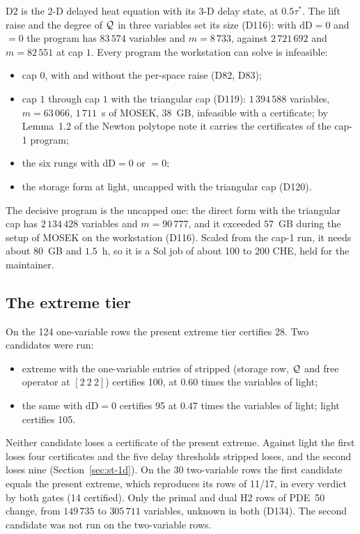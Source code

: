 D2 is the 2-D delayed heat equation with its 3-D delay state, at $0.5\tau^*$. The lift raise and the degree of $\mathcal{Q}$ in three variables set its size (D116): with $\mathrm{dD}=0$ and  $=0$ the program has $83\,574$ variables and $m=8\,733$, against $2\,721\,692$ and $m=82\,551$ at cap $1$. Every program the workstation can solve is infeasible:
\begin{itemize}\setlength\itemsep{0pt}
\item cap $0$, with and without the per-space raise (D82, D83);
\item cap $1$ through cap $1$ with the triangular cap (D119): $1\,394\,588$ variables, $m=63\,066$, $1\,711$~s of MOSEK, $38$~GB, infeasible with a certificate; by Lemma~1.2 of the Newton polytope note it carries the certificates of the cap-1 program;
\item the six rungs with $\mathrm{dD}=0$ or  $=0$;
\item the storage form at light, uncapped with the triangular cap (D120).
\end{itemize}
The decisive program is the uncapped one: the direct form with the triangular cap has $2\,134\,428$ variables and $m=90\,777$, and it exceeded $57$~GB during the setup of MOSEK on the workstation (D116). Scaled from the cap-1 run, it needs about $80$~GB and $1.5$~h, so it is a Sol job of about 100 to 200 CHE, held for the maintainer.

\subsection{The extreme tier}\label{sec:st-extreme}

On the 124 one-variable rows the present extreme tier certifies 28. Two candidates were run:
\begin{itemize}\setlength\itemsep{0pt}
\item extreme with the one-variable entries of stripped (storage row, $\mathcal{Q}$ and free operator at $[2\ 2\ 2]$) certifies 100, at $0.60$ times the variables of light;
\item the same with $\mathrm{dD}=0$ certifies 95 at $0.47$ times the variables of light; light certifies 105.
\end{itemize}
Neither candidate loses a certificate of the present extreme. Against light the first loses four certificates and the five delay thresholds stripped loses, and the second loses nine (Section~\ref{sec:st-1d}). On the 30 two-variable rows the first candidate equals the present extreme, which reproduces its rows of 11/17, in every verdict by both gates (14 certified). Only the primal and dual H2 rows of PDE~50 change, from $149\,735$ to $305\,711$ variables, unknown in both (D134). The second candidate was not run on the two-variable rows.

